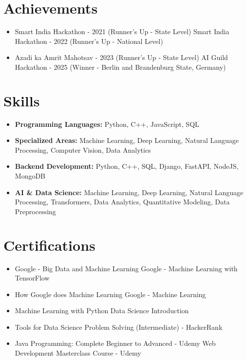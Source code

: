 \documentclass[a4paper,10pt]{article}
\begin{document}
\section*{Achievements}
\begin{itemize}
\item Smart India Hackathon - 2021 (Runner's Up - State Level) \hfill Smart India Hackathon - 2022 (Runner's Up - National Level)
\item Azadi ka Amrit Mahotsav - 2023 (Runner's Up - State Level) \hfill AI Guild Hackathon - 2025 (Winner - Berlin and Brandenburg State, Germany)
\end{itemize}

\section*{Skills}
\begin{itemize}
  \item \textbf{Programming Languages:} Python, C++, JavaScript, SQL
  \item \textbf{Specialized Areas:} Machine Learning, Deep Learning, Natural Language Processing, Computer Vision, Data Analytics
  \item \textbf{Backend Development:} Python, C++, SQL, Django, FastAPI, NodeJS, MongoDB
  \item \textbf{AI \& Data Science:} Machine Learning, Deep Learning, Natural Language Processing, Transformers, Data Analytics, Quantitative Modeling, Data Preprocessing
\end{itemize}

\section*{Certifications}
\begin{itemize}
\item Google - Big Data and Machine Learning \hfill Google - Machine Learning with TensorFlow
\item How Google does Machine Learning \hfill Google - Machine Learning
\item Machine Learning with Python \hfill Data Science Introduction
\item Tools for Data Science \hfill Problem Solving (Intermediate) - HackerRank
\item Java Programming: Complete Beginner to Advanced - Udemy \hfill Web Development Masterclass Course - Udemy
\end{itemize}
\end{document}
